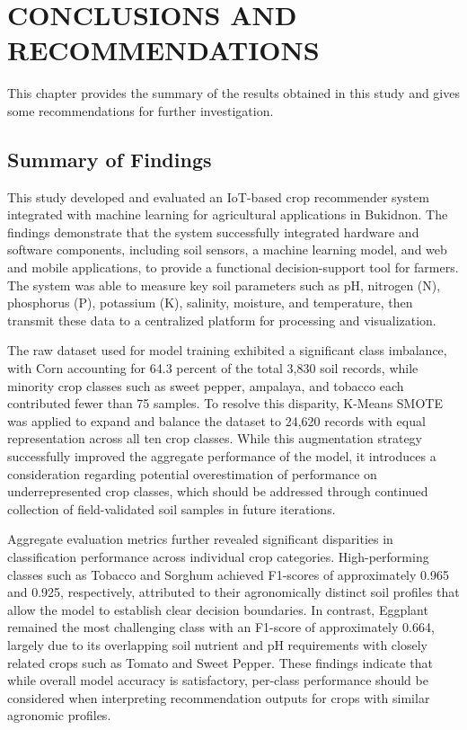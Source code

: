 \chapter{CONCLUSIONS AND RECOMMENDATIONS}
{\baselineskip

This chapter provides the summary of the results obtained in this study and gives some recommendations for further investigation.

\section{Summary of Findings}

This study developed and evaluated an IoT-based crop recommender system integrated with machine learning for agricultural applications in Bukidnon. The findings demonstrate that the system successfully integrated hardware and software components, including soil sensors, a machine learning model, and web and mobile applications, to provide a functional decision-support tool for farmers. The system was able to measure key soil parameters such as pH, nitrogen (N), phosphorus (P), potassium (K), salinity, moisture, and temperature, then transmit these data to a centralized platform for processing and visualization.

The raw dataset used for model training exhibited a significant class imbalance, with Corn accounting for 64.3 percent of the total 3,830 soil records, while minority crop classes such as sweet pepper, ampalaya, and tobacco each contributed fewer than 75 samples. To resolve this disparity, K-Means SMOTE was applied to expand and balance the dataset to 24,620 records with equal representation across all ten crop classes. While this augmentation strategy successfully improved the aggregate performance of the model, it introduces a consideration regarding potential overestimation of performance on underrepresented crop classes, which should be addressed through continued collection of field-validated soil samples in future iterations.

Aggregate evaluation metrics further revealed significant disparities in classification performance across individual crop categories. High-performing classes such as Tobacco and Sorghum achieved F1-scores of approximately 0.965 and 0.925, respectively, attributed to their agronomically distinct soil profiles that allow the model to establish clear decision boundaries. In contrast, Eggplant remained the most challenging class with an F1-score of approximately 0.664, largely due to its overlapping soil nutrient and pH requirements with closely related crops such as Tomato and Sweet Pepper. These findings indicate that while overall model accuracy is satisfactory, per-class performance should be considered when interpreting recommendation outputs for crops with similar agronomic profiles.

}
